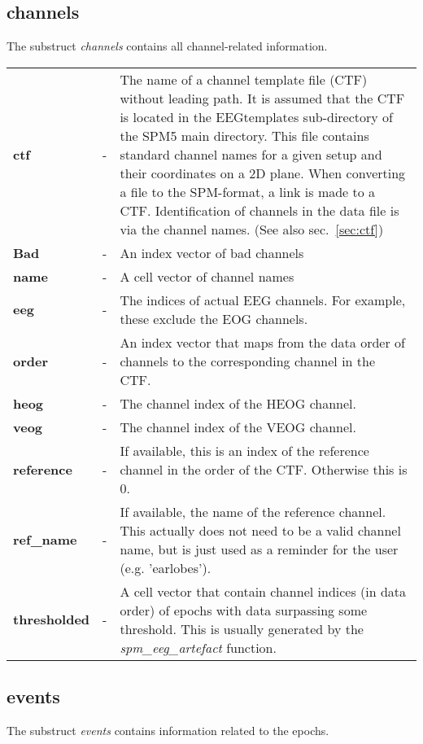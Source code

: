 \subsection{channels}
The substruct {\it channels} contains all channel-related
information.

\begin{tabular}{lcp{9cm}}
{\bf ctf} & - & The name of a channel template file (CTF) without leading
path. It is assumed that the CTF is located in the EEGtemplates
sub-directory of the SPM5 main directory. This file
contains standard channel names for a given setup and their
coordinates on a 2D plane. When converting a file to the SPM-format, a
link is made to a CTF. Identification of channels in the data file is
via the channel names. (See also sec.~\ref{sec:ctf})\\
{\bf Bad} & - & An index vector of bad channels\\
{\bf name} & - & A cell vector of channel names\\
{\bf eeg} & - & The indices of actual EEG channels. For example, these
exclude the EOG channels.\\ 
{\bf order} & - & An index vector that maps from the data order of
channels to the corresponding channel in the CTF.\\
{\bf heog} & - & The channel index of the HEOG channel.\\
{\bf veog} & - & The channel index of the VEOG channel.\\
{\bf reference} & - & If available, this is an index of the reference
channel in the order of the CTF. Otherwise this is 0.\\
{\bf ref\_name} & - & If available, the name of the reference
channel. This actually does not need to be a valid channel name, but
is just used as a reminder for the user (e.g. 'earlobes').\\
{\bf thresholded} & - & A cell vector that contain channel indices (in
data order) of epochs with data surpassing some threshold. This is
usually generated by the {\it spm\_eeg\_artefact} function.\\
\end{tabular}

\subsection{events}
The substruct {\it events} contains information related to the epochs.

